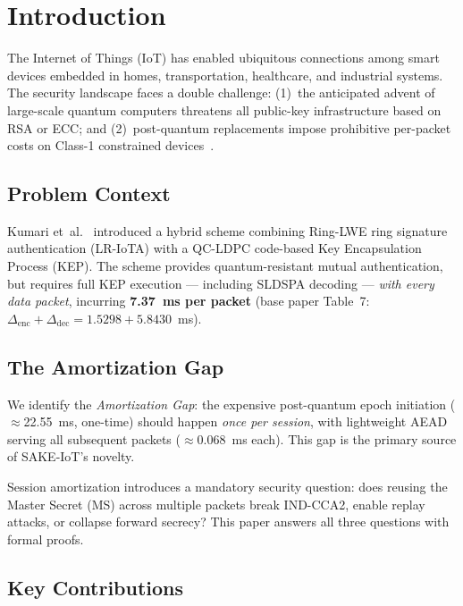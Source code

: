 \documentclass[conference]{IEEEtran}
\begin{document}
\section{Introduction}
\label{sec:intro}

The Internet of Things (IoT) has enabled ubiquitous connections among
smart devices embedded in homes, transportation, healthcare, and
industrial systems. The security landscape faces a double challenge:
(1)~the anticipated advent of large-scale quantum computers threatens
all public-key infrastructure based on RSA or ECC; and (2)~post-quantum
replacements impose prohibitive per-packet costs on Class-1 constrained
devices~\cite{rfc7228}.

\subsection{Problem Context}

Kumari et~al.~\cite{kumari2022} introduced a hybrid scheme combining
Ring-LWE ring signature authentication (LR-IoTA) with a QC-LDPC
code-based Key Encapsulation Process (KEP). The scheme provides
quantum-resistant mutual authentication, but requires full KEP
execution --- including SLDSPA decoding --- \emph{with every data
packet}, incurring \textbf{7.37~ms per packet} (base paper Table~7:
$\Delta_{\mathrm{enc}} + \Delta_{\mathrm{dec}} = 1.5298 + 5.8430$~ms).

\subsection{The Amortization Gap}

We identify the \emph{Amortization Gap}: the expensive post-quantum
epoch initiation ($\approx$22.55~ms, one-time) should happen
\emph{once per session}, with lightweight AEAD serving all subsequent
packets ($\approx$0.068~ms each). This gap is the primary source of
SAKE-IoT's novelty.

Session amortization introduces a mandatory security question: does
reusing the Master Secret (MS) across multiple packets break IND-CCA2,
enable replay attacks, or collapse forward secrecy? This paper answers
all three questions with formal proofs.

\subsection{Key Contributions}
\end{document}
